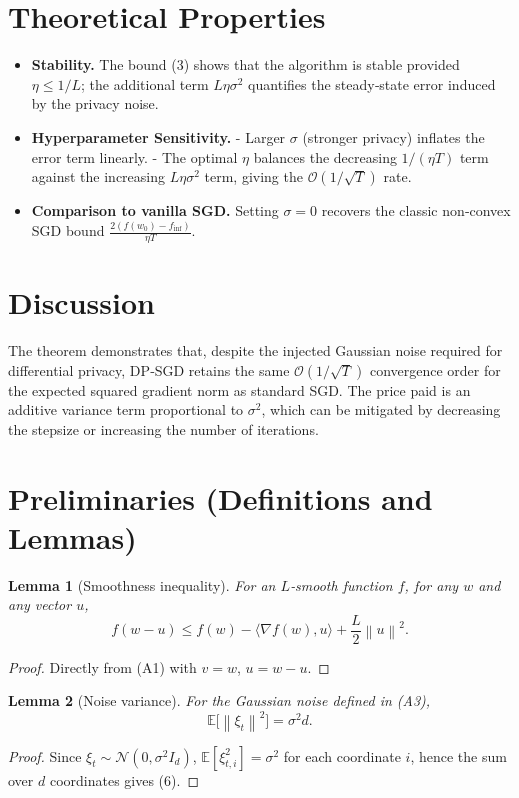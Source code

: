 \documentclass[11pt]{article}
\newtheorem{lemma}{Lemma}
\newcommand{\EE}{\mathbb{E}}
\newcommand{\norm}[1]{\left\lVert #1 \right\rVert}
\begin{document}
\section*{Theoretical Properties}
\begin{itemize}
\item \textbf{Stability.} The bound (3) shows that the algorithm is stable
provided $\eta\le 1/L$; the additional term $L\eta\sigma^{2}$ quantifies the
steady‑state error induced by the privacy noise.
\item \textbf{Hyperparameter Sensitivity.}
  - Larger $\sigma$ (stronger privacy) inflates the error term linearly.
  - The optimal $\eta$ balances the decreasing $1/(\eta T)$ term against the
    increasing $L\eta\sigma^{2}$ term, giving the $\mathcal O(1/\sqrt{T})$ rate.
\item \textbf{Comparison to vanilla SGD.}
  Setting $\sigma=0$ recovers the classic non‑convex SGD bound
  $\frac{2(f(w_0)-f_{\inf})}{\eta T}$.
\end{itemize}

\section*{Discussion}
The theorem demonstrates that, despite the injected Gaussian noise required
for differential privacy, DP‑SGD retains the same $\mathcal O(1/\sqrt{T})$
convergence order for the expected squared gradient norm as standard SGD.
The price paid is an additive variance term proportional to $\sigma^{2}$,
which can be mitigated by decreasing the stepsize or increasing the number
of iterations.

\newpage
\section*{Preliminaries (Definitions and Lemmas)}
\begin{lemma}[Smoothness inequality]
\label{lem:smooth}
For an $L$‑smooth function $f$, for any $w$ and any vector $u$,
\[
f(w-u)\le f(w)-\langle\nabla f(w),u\rangle
+\frac{L}{2}\norm{u}^{2}.
\tag{5}
\]
\end{lemma}
\begin{proof}
Directly from (A1) with $v=w$, $u=w-u$.
\end{proof}

\begin{lemma}[Noise variance]
\label{lem:noise}
For the Gaussian noise defined in (A3),
\[
\EE\!\big[\norm{\xi_t}^{2}\big]=\sigma^{2}d .
\tag{6}
\]
\end{lemma}
\begin{proof}
Since $\xi_t\sim\mathcal N(0,\sigma^{2}I_d)$,
$\EE[\xi_{t,i}^{2}]=\sigma^{2}$ for each coordinate $i$,
hence the sum over $d$ coordinates gives (6).
\end{proof}
\end{document}
